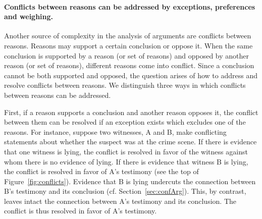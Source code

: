 \documentclass[10pt]{article}
\begin{document}
\paragraph{Conflicts between reasons can be addressed by exceptions, preferences and weighing.} 
Another source of complexity in the analysis of arguments are conflicts between reasons. 
Reasons may support a certain conclusion or oppose it.
When the same conclusion is supported by a reason (or set of reasons) 
and opposed by another reason (or set of reasons),
different reasons come into conflict. Since a conclusion cannot 
be both supported and opposed, the question arises of how to address and resolve conflicts between reasons. 
We distinguish three ways in which conflicts between reasons can be addressed. 

First, if a reason supports a conclusion and another reason opposes it, the conflict between them can be resolved if an exception exists which 
excludes one of the reasons. For instance, suppose two witnesses, A and B, make conflicting statements about 
whether the suspect was at the crime scene. If there is evidence that one witness is lying, 
the conflict is resolved in favor of the witness against whom there is no evidence of lying. 
If there is evidence that witness B is lying, 
the conflict is resolved in favor of A's testimony (see the top of Figure~\ref{fig:conflicts}). %
 Evidence that B is lying 
undercuts the connection between B's testimony and its conclusion (cf. Section~\ref{sec:confArg}). %
This, by contrast, 
leaves intact the connection between A's testimony and its conclusion. The conflict 
is thus resolved in favor of A's testimony. 



\end{document}
